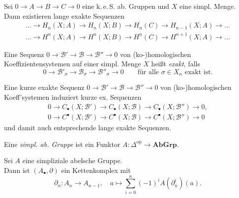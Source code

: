 \documentclass{cheat-sheet}
\newcommand{\AbGrp}{\mathbf{AbGrp}} %
\newcommand{\op}{\mathrm{op}} %
\newcommand{\CC}[1]{{#1}_{\bullet}} %
\newcommand{\CCC}[1]{{#1}^{\bullet}} %
\newcommand{\keS}{k.\,e.\,S.} %
\begin{document}
\begin{kor}
  Sei $0 \to A \to B \to C \to 0$ eine \keS{} ab. Gruppen und $X$ eine simpl. Menge. Dann existieren lange exakte Sequenzen
  \begin{align*}
    \ldots \to H_n(X; A) \to H_n(X; B) \to H_n(C) \to H_{n-1}(X; A) \to \ldots \\
    \ldots \to H^n(X; A) \to H^n(X; B) \to H^n(C) \to H^{n+1}(X; A) \to \ldots
  \end{align*}
\end{kor}



\begin{defn}
  Eine Sequenz $0 \to \mathcal{B}' \to \mathcal{B} \to \mathcal{B}'' \to 0$ von (ko-)homologischen Koeffizientensystemen auf einer simpl. Menge $X$ heißt \emph{exakt}, falls
  \[
    0 \to \mathcal{B}'_\sigma \to \mathcal{B}_\sigma \to \mathcal{B}''_\sigma \to 0 \qquad
    \text{für alle $\sigma \in X_n$ exakt ist.}
  \]
\end{defn}

\begin{lem}
  Eine kurze exakte Sequenz $0 \to \mathcal{B}' \to \mathcal{B} \to \mathcal{B}'' \to 0$ von (ko-)homologischen Koeff'systemen induziert kurze ex. Sequenzen
  \begin{align*}
    0 \to \CC{C}(X; \mathcal{B}') \to \CC{C}(X; \mathcal{B}) \to \CC{C}(X; \mathcal{B}'') \to 0, \\
    0 \to \CCC{C}(X; \mathcal{B}') \to \CCC{C}(X; \mathcal{B}) \to \CCC{C}(X; \mathcal{B}'') \to 0
  \end{align*}
  und damit auch entsprechende lange exakte Sequenzen.
\end{lem}



\begin{defn}
  Eine \emph{simpl. ab. Gruppe} ist ein Funktor
  $A : \Delta^\op \to \AbGrp$.
\end{defn}

\begin{defn}
  Sei $A$ eine simpliziale abelsche Gruppe. \\
  Dann ist $(A_\bullet, \partial)$ ein Kettenkomplex mit
  \[
    \partial_n : A_n \to A_{n-1}, \quad
    a \mapsto \sum_{i=0}^n (-1)^i A(\partial_n^i)(a).
  \]
\end{defn}
\end{document}

